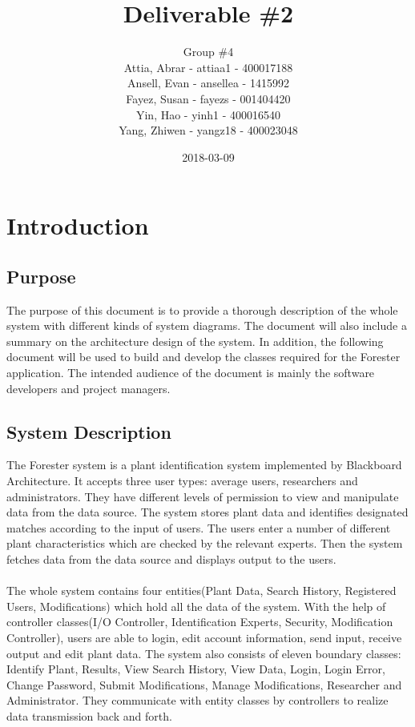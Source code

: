 \documentclass[]{article}
\title{Deliverable \#2}
\author{Group \#4 \\
Attia, Abrar - attiaa1 - 400017188 \\
Ansell, Evan - ansellea - 1415992 \\
Fayez, Susan - fayezs - 001404420 \\
Yin, Hao - yinh1 - 400016540 \\
Yang, Zhiwen - yangz18 - 400023048 }
\date{2018-03-09}
\begin{document}
\maketitle	
\newpage

\section{Introduction}
\label{sec:introduction}



\subsection{Purpose}
\label{sub:purpose}
The purpose of this document is to provide a thorough description of the whole system with different kinds of system diagrams. The document will also include a summary on the architecture design of the system. In addition, the following document will be used to build and develop the classes required for the Forester application. The intended audience of the document is mainly the software developers and project managers.

\subsection{System Description}
\label{sub:system_description}

The Forester system is a plant identification system implemented by Blackboard Architecture. It accepts three user types: average users, researchers and administrators. They have different levels of permission to view and manipulate data from the data source. The system stores plant data and identifies designated matches according to the input of users. The users enter a number of different plant characteristics which are checked by the relevant experts. Then the system fetches data from the data source and displays output to the users. \\
	\\
The whole system contains four entities(Plant Data, Search History, Registered Users, Modifications) which hold all the data of the system. With the help of controller classes(I/O Controller, Identification Experts, Security, Modification Controller), users are able to login, edit account information, send input, receive output and edit plant data. The system also consists of eleven boundary classes: Identify Plant, Results, View Search History, View Data, Login, Login Error, Change Password, Submit Modifications, Manage Modifications, Researcher and Administrator. They communicate with entity classes by controllers to realize data transmission back and forth.
\end{document}
